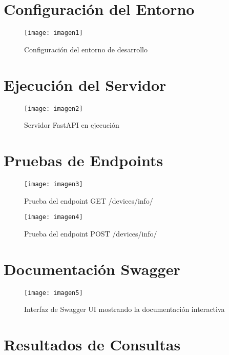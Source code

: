 \documentclass[12pt,letterpaper]{report}
\begin{document}
\section{Configuración del Entorno}

\begin{figure}[h]
    \centering
    \texttt{[image: imagen1]}
    \caption{Configuración del entorno de desarrollo}
    \label{fig:configuracion}
\end{figure}

\section{Ejecución del Servidor}

\begin{figure}[h]
    \centering
    \texttt{[image: imagen2]}
    \caption{Servidor FastAPI en ejecución}
    \label{fig:servidor}
\end{figure}

\section{Pruebas de Endpoints}

\begin{figure}[h]
    \centering
    \texttt{[image: imagen3]}
    \caption{Prueba del endpoint GET /devices/info/}
    \label{fig:endpoint1}
\end{figure}

\begin{figure}[h]
    \centering
    \texttt{[image: imagen4]}
    \caption{Prueba del endpoint POST /devices/info/}
    \label{fig:endpoint2}
\end{figure}

\section{Documentación Swagger}

\begin{figure}[h]
    \centering
    \texttt{[image: imagen5]}
    \caption{Interfaz de Swagger UI mostrando la documentación interactiva}
    \label{fig:swagger}
\end{figure}

\section{Resultados de Consultas}
\end{document}
